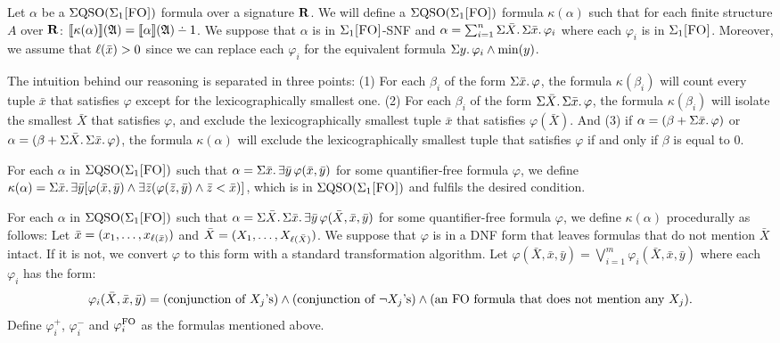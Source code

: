 Let $\alpha$ be a $\Sigma{\rm QSO}(\Sigma_{1}\textsc{[FO]})$ formula over a signature $\mathbf{R}$. We will define a $\Sigma{\rm QSO}(\Sigma_{1}\textsc{[FO]})$ formula $\kappa(\alpha)$ such that for each finite structure $A$ over $\mathbf{R}$: $\sem{\kappa(\alpha)}(\A) = \sem{\alpha}(\A) \dotminus 1$. We suppose that $\alpha$ is in $\Sigma_{1}\textsc{[FO]}$-SNF and $\alpha = \sum_{i = 1}^{n}\Sigma{\bar{X}}.\,\Sigma{\bar{x}}.\,\varphi_i$ where each $\varphi_i$ is in $\Sigma_{1}\textsc{[FO]}$. Moreover, we assume that $\ell(\bar{x}) > 0$ since we can replace each $\varphi_i$ for the equivalent formula $\Sigma{y}.\,\varphi_i\wedge\min(y)$.

The intuition behind our reasoning is separated in three points: (1) For each $\beta_i$ of the form $\Sigma{\bar{x}}.\,\varphi$, the formula $\kappa(\beta_i)$ will count every tuple $\bar{x}$ that satisfies $\varphi$ except for the lexicographically smallest one. (2) For each $\beta_i$ of the form $\Sigma{\bar{X}}.\,\Sigma{\bar{x}}.\,\varphi$, the formula $\kappa(\beta_i)$ will isolate the smallest $\bar{X}$ that satisfies $\varphi$, and exclude the lexicographically smallest tuple $\bar{x}$ that satisfies $\varphi(\bar{X})$. And (3) if $\alpha = (\beta+\Sigma{\bar{x}}.\,\varphi)$ or $\alpha = (\beta+\Sigma{\bar{X}}.\,\Sigma{\bar{x}}.\,\varphi)$, the formula $\kappa(\alpha)$ will exclude the lexicographically smallest tuple that satisfies $\varphi$ if and only if $\beta$ is equal to 0.

\vspace{1em}

For each $\alpha$ in $\Sigma{\rm QSO}(\Sigma_{1}\textsc{[FO]})$ such that $\alpha = \Sigma{\bar{x}}.\,\exists\bar{y}\,\varphi(\bar{x},\bar{y})$ for some quantifier-free formula $\varphi$, we define $\kappa(\alpha) = \Sigma{\bar{x}}.\,\exists\bar{y}[\varphi(\bar{x},\bar{y})\wedge\exists\bar{z}(\varphi(\bar{z},\bar{y})\wedge\bar{z} < \bar{x})]$, which is in $\Sigma{\rm QSO}(\Sigma_{1}\textsc{[FO]})$ and fulfils the desired condition.

\vspace{1em}

For each $\alpha$ in $\Sigma{\rm QSO}(\Sigma_{1}\textsc{[FO]})$ such that $\alpha = \Sigma{\bar{X}}.\,\Sigma{\bar{x}}.\,\exists\bar{y}\,\varphi(\bar{X},\bar{x},\bar{y})$ for some quantifier-free formula $\varphi$, we define $\kappa(\alpha)$ procedurally as follows: Let $\bar{x} = (x_1,\ldots,x_{\ell(\bar{x})})$ and $\bar{X} = (X_1,\ldots,X_{\ell(\bar{X})})$. We suppose that $\varphi$ is in a DNF form that leaves formulas that do not mention $\bar{X}$ intact. If it is not, we convert $\varphi$ to this form with a standard transformation algorithm. Let $\varphi(\bar{X},\bar{x},\bar{y}) = \bigvee_{i = 1}^m\varphi_i(\bar{X},\bar{x},\bar{y})$ where each $\varphi_i$ has the form:
$$
\varphi_i(\bar{X},\bar{x},\bar{y}) = (\text{conjunction of $X_j$'s}) \wedge (\text{conjunction of $\neg X_j$'s})  \wedge (\text{an ${\rm FO}$ formula that does not mention any $X_j$}).
$$
Define $\varphi_i^{+}$, $\varphi_i^{-}$ and $\varphi_i^{{\rm FO}}$ as the formulas mentioned above. 

